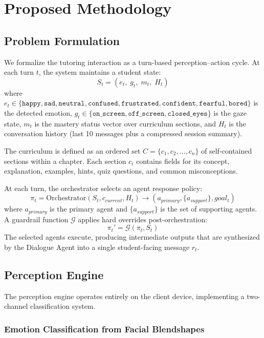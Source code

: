 \documentclass[conference, letterpaper]{IEEEtran}
\begin{document}
\section{Proposed Methodology}

\subsection{Problem Formulation}

We formalize the tutoring interaction as a turn-based perception--action cycle. At each turn $t$, the system maintains a student state:
\[
S_t = (e_t,\; g_t,\; m_t,\; H_t)
\]
where $e_t \in \{\texttt{happy}, \texttt{sad}, \texttt{neutral}, \texttt{confused}, \texttt{frustrated}, \texttt{confident}, \texttt{fearful}, \texttt{bored}\}$ is the detected emotion, $g_t \in \{\texttt{on\_screen}, \texttt{off\_screen}, \texttt{closed\_eyes}\}$ is the gaze state, $m_t$ is the mastery status vector over curriculum sections, and $H_t$ is the conversation history (last 10 messages plus a compressed session summary).

The curriculum is defined as an ordered set $C = \{c_1, c_2, \ldots, c_n\}$ of self-contained sections within a chapter. Each section $c_i$ contains fields for its concept, explanation, examples, hints, quiz questions, and common misconceptions.

At each turn, the orchestrator selects an agent response policy:
\[
\pi_t = \text{Orchestrator}(S_t, c_{current}, H_t) \rightarrow (a_{primary}, \{a_{support}\}, goal_t)
\]
where $a_{primary}$ is the primary agent and $\{a_{support}\}$ is the set of supporting agents. A guardrail function $\mathcal{G}$ applies hard overrides post-orchestration:
\[
\pi_t' = \mathcal{G}(\pi_t, S_t)
\]
The selected agents execute, producing intermediate outputs that are synthesized by the Dialogue Agent into a single student-facing message $r_t$.

\subsection{Perception Engine}

The perception engine operates entirely on the client device, implementing a two-channel classification system.

\subsubsection{Emotion Classification from Facial Blendshapes}
\end{document}
